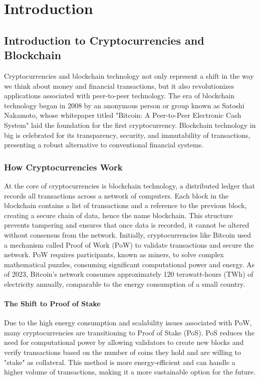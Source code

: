 \chapter{Introduction}

\section{Introduction to Cryptocurrencies and Blockchain}
Cryptocurrencies and blockchain technology not only represent a shift in the way we think about money and financial transactions, but it also revolutionizes 
applications associated with peer-to-peer technology. The era of blockchain technology began in 2008 by an anonymous person or group known as Satoshi Nakamoto,
 whose whitepaper titled "Bitcoin: A Peer-to-Peer Electronic Cash System" laid the foundation for the first cryptocurrency. 
 Blockchain technology in big is celebrated for its transparency, security, and immutability of transactions, presenting a robust alternative to conventional 
 financial systems.

\subsection{How Cryptocurrencies Work}
At the core of cryptocurrencies is blockchain technology, a distributed ledger that records all transactions across a network of computers. Each block in the 
blockchain contains a list of transactions and a reference to the previous block, creating a secure chain of data, hence the name blockchain. This structure 
prevents tampering and ensures that once data is recorded, it cannot be altered without consensus from the network.
Initially, cryptocurrencies like Bitcoin used a mechanism called Proof of Work (PoW) to validate transactions and secure the network. PoW requires participants, 
known as miners, to solve complex mathematical puzzles, consuming significant computational power and energy. As of 2023, Bitcoin's network consumes 
approximately 120 terawatt-hours (TWh) of electricity annually, comparable to the energy consumption of a small country.

\subsubsection{The Shift to Proof of Stake}
Due to the high energy consumption and scalability issues associated with PoW, many cryptocurrencies are transitioning to Proof of Stake (PoS). 
PoS reduces the need for computational power by allowing validators to create new blocks and verify transactions based on the number of coins they
 hold and are willing to "stake" as collateral. This method is more energy-efficient and can handle a higher volume of transactions, making it a more
  sustainable option for the future.

